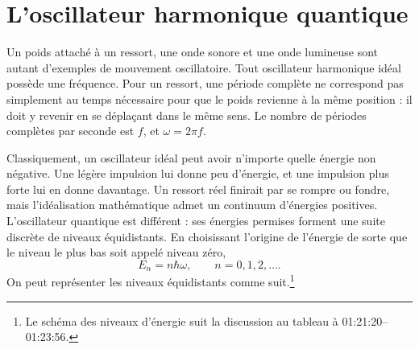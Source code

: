 \begin{classroomqa}
\end{classroomqa}

\begin{classroomqa}
\end{classroomqa}

\begin{classroomqa}
\end{classroomqa}

\section{L’oscillateur harmonique quantique}

Un poids attaché à un ressort, une onde sonore et une onde lumineuse sont autant d’exemples de mouvement oscillatoire. Tout oscillateur harmonique idéal possède une fréquence. Pour un ressort, une période complète ne correspond pas simplement au temps nécessaire pour que le poids revienne à la même position : il doit y revenir en se déplaçant dans le même sens. Le nombre de périodes complètes par seconde est \(f\), et \(\omega=2\pi f\).

Classiquement, un oscillateur idéal peut avoir n’importe quelle énergie non négative. Une légère impulsion lui donne peu d’énergie, et une impulsion plus forte lui en donne davantage. Un ressort réel finirait par se rompre ou fondre, mais l’idéalisation mathématique admet un continuum d’énergies positives. L’oscillateur quantique est différent : ses énergies permises forment une suite discrète de niveaux équidistants. En choisissant l’origine de l’énergie de sorte que le niveau le plus bas soit appelé niveau zéro,
\begin{equation}
E_n=n\hbar\omega,
\qquad n=0,1,2,\ldots .
\end{equation}
On peut représenter les niveaux équidistants comme suit.\footnote{Le schéma des niveaux d’énergie suit la discussion au tableau à 01:21:20--01:23:56.}

